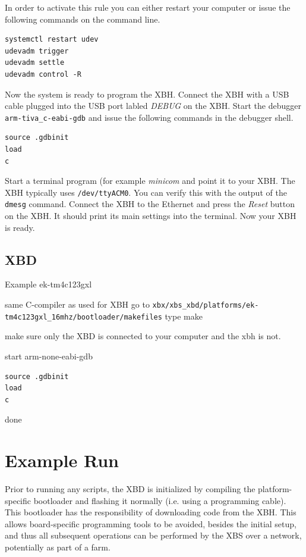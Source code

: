 \documentclass[twoside,11pt]{cergdoc}
\begin{document}
In order to activate this rule you can either restart your computer or issue the
following commands on the command line.

\begin{lstlisting}
systemctl restart udev 
udevadm trigger
udevadm settle
udevadm control -R
\end{lstlisting}

Now the system is ready to program the XBH. Connect the XBH with a USB cable plugged into
the USB port labled \emph{DEBUG} on the XBH. Start the debugger \verb|arm-tiva_c-eabi-gdb|
and issue the following commands in the debugger shell.

\begin{lstlisting}
source .gdbinit
load
c
\end{lstlisting}

Start a terminal program (for example \emph{minicom} 
and point it to your XBH. The XBH typically uses \verb|/dev/ttyACM0|.
You can verify this with the output of the \texttt{dmesg} command. Connect the XBH to the
Ethernet and press the \emph{Reset} button on the XBH. It should print its main 
settings into the terminal. Now your XBH is ready.

\subsection{XBD}
Example ek-tm4c123gxl

same C-compiler as used for XBH
go to 
\verb|xbx/xbs_xbd/platforms/ek-tm4c123gxl_16mhz/bootloader/makefiles|
type make

make sure only the XBD is connected to your computer and the xbh is not.

start
arm-none-eabi-gdb

\begin{lstlisting}
source .gdbinit
load
c
\end{lstlisting}

done

  \section{Example Run}
Prior to running any scripts, the XBD is initialized by compiling the
platform-specific bootloader and flashing it normally (i.e. using a programming
cable). 
This bootloader has the responsibility of downloading code from the XBH. This allows board-specific
programming tools to be avoided, besides the initial setup, and thus all
subsequent operations can be performed by the XBS over a network, potentially as
part of a farm.
\end{document}
